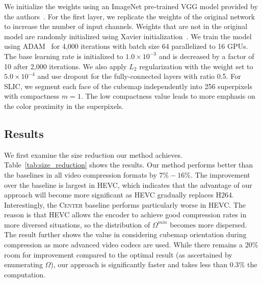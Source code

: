 \documentclass[journal,transmag]{IEEEtran}
\begin{document}
We initialize the weights using an ImageNet pre-trained VGG model provided by the authors~\cite{simonyan2014very}.
For the first layer, we replicate the weights of the original network to increase the number of input channels.
Weights that are not in the original model are randomly initialized using Xavier initialization~\cite{glorot2010initialization}.
We train the model using ADAM~\cite{kingma2014adam} for 4,000 iterations with batch size 64 parallelized to 16 GPUs.
The base learning rate is initialized to $1.0 \times 10^{-3}$ and is decreased by a factor of 10 after 2,000 iterations.
We also apply $L_{2}$ regularization with the weight set to $5.0 \times 10^{-4}$ and use dropout for the fully-connected layers with ratio 0.5.
For SLIC,
we segment each face of the cubemap independently into 256 superpixels with compactness $m{=}1$.
The low compactness value leads to more emphasis on the color proximity in the superpixels.



\subsection{Results}
\label{sub:results}


We first examine the size reduction our method achieves.
Table~\ref{tab:size_reduction} shows the results.  
Our method performs better than the baselines in all video compression formats by $7\%-16\%$.
The improvement over the baseline is largest in HEVC,
which indicates that the advantage of our approach will become more significant as HEVC gradually replaces H264.
Interestingly,
the \textsc{Center} baseline performs particularly worse in HEVC.
The reason is that HEVC allows the encoder to achieve good compression rates in more diversed situations,
so the distribution of $\Omega^{min}$ becomes more dispersed.
The result further shows the value in considering cubemap orientation during compression as more advanced video codecs are used.
While there remains a $20\%$ room for improvement compared to the optimal result (as ascertained by enumerating $\Omega$),
our approach is significantly faster and takes less than $0.3\%$ the computation.
\end{document}
